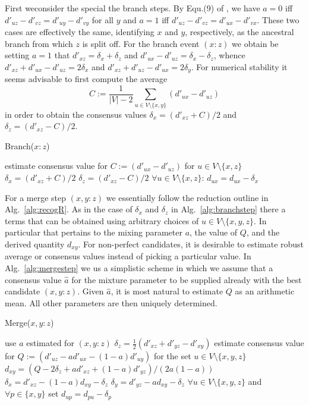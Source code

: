 \documentclass{article}
\begin{document}
First weconsider the special the branch steps. By Equ.(9) of
\cite{Prohaska:17a}, we have $a=0$ iff $d'_{uz}-d'_{vz} =
d'_{uy}-d'_{vy}$ for all $y$ and $a=1$ iff $d'_{uz}-d'_{vz} =
d'_{ux}-d'_{vx}$. These two cases are effectively the same, identifying $x$
and $y$, respectively, as the ancestral branch from which $z$ is split
off. For the branch event $(x:z)$ we obtain be setting $a=1$ that 
$d'_{xz}=\delta_x+\delta_z$ and
$d'_{ux}-d'_{uz}=\delta_x-\delta_z$, whence
$d'_{xz}+d'_{ux}-d'_{uz}=2\delta_x$ and
$d'_{xz}+d'_{uz}-d'_{ux}=2\delta_y$.  For numerical stability it seems
advisable to first compute the average
\begin{equation} 
  C := \frac{1}{|V|-2} \sum_{u\in V\setminus\{x,y\}} (d'_{ux}-d'_{uz})
\end{equation} 
in order to obtain the consensus values $\delta_x = (d'_{xz}+C)/2$ and
$\delta_z = (d'_{xz}-C)/2$.

\begin{algorithm}[H]
\caption{Branch($x:z$)} 
\label{alg:branchstep}
\SetAlgoLined
estimate consensus value for $C:=(d'_{ux}-d'_{uz})$ for $u\in
V\setminus\{x,z\}$ \;
$\delta_x = (d'_{xz}+C)/2$\;
$\delta_z = (d'_{xz}-C)/2$\;
$\forall u\in V\setminus\{x,z\}$: $d_{ux} =  d_{ux}-\delta_x$\;
\end{algorithm} 

For a merge step $(x,y:z)$ we essentially follow the reduction outline in
Alg.~\ref{alg:recogR}. As in the case of $\delta_x$ and $\delta_z$ in
Alg.~\ref{alg:branchstep} there a terms that can be obtained using
arbitrary choices of $u\in V\setminus\{x,y,z\}$. In particular that
pertains to the mixing parameter $a$, the value of $Q$, and the derived
quantity $d_{xy}$. For non-perfect candidates, it is desirable to estimate
robust average or consensus values instead of picking a particular value.
In Alg.~\ref{alg:mergestep} we us a simplistic scheme in which we assume
that a consensus value $\hat a$ for the mixture parameter to be supplied
already with the best candidate $(x,y:z)$. Given $\hat a$, it is most
natural to estimate $Q$ as an arithmetic mean. All other parameters are
then uniquely determined.

\begin{algorithm}[H]
\caption{Merge($x,y:z$)} 
\label{alg:mergestep} 
\SetAlgoLined
use $a$ estimated for $(x,y:z)$\;
$\delta_z = \frac{1}{2}(d'_{xz}+d'_{yz}-d'_{xy})$\;
estimate consensus value for $Q:=(d'_{uz}-a d'_{ux}-(1-a) d'_{uy})$ for the 
set $u\in V\setminus\{x,y,z\}$\;
$d_{xy} = (Q-2 \delta_z + a d'_{xz}+(1-a) d'_{yz})/(2a(1-a))$\;
$\delta_x = d'_{xz} - (1-a) d_{xy} - \delta_z$\;
$\delta_y = d'_{yz} -   a   d_{xy} - \delta_z$\;
$\forall u\in V\setminus\{x,y,z\}$ and $\forall p\in\{x,y\}$ set   
$d_{up} = d_{pu} -\delta_p$\;
\end{algorithm} 
\end{document}
